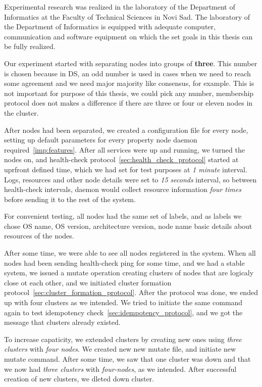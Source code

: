 Experimental research was realized in the laboratory of the Department of Informatics at the Faculty of Technical Sciences in Novi Sad. The laboratory of the Department of Informatics is equipped with adequate computer, communication and software equipment on which the set goals in this thesis can be fully realized.

Our experiment started with separating nodes into groups of \textbf{three}. This number is chosen because in DS, an odd number is used in cases when we need to reach some agreement and we need major majority like consensus, for example. This is not important for purpose of this thesis, we could pick any number, membership protocol does not makes a difference if there are three or four or eleven nodes in the cluster.

After nodes had been separated, we created a configuration file for every node, setting up default parameters for every property node daemon required~\ref{imp:features}. After all services were up and running, we turned the nodes on, and health-check protocol~\ref{sec:health_check_protocol} started at uprfront defined time, which we had set for test purposes at \emph{1 minute} interval. Logs, resources and other node details were set to \emph{15 seconds} interval, so between health-check intervals, daemon would collect resource information \emph{four times} before sending it to the rest of the system.

For convenient testing, all nodes had the same set of labels, and as labels we chose OS name, OS version, architecture version, node name basic details about resources of the nodes.

After some time, we were able to see all nodes registered in the system. When all nodes had been sending health-check ping for some time, and we had a stable system, we issued a mutate operation creating clusters of nodes that are logicaly close ot each other, and we initiated cluster formation protocol~\ref{sec:cluster_formation_protocol}. After the protocol was done, we ended up with four clusters as we intended. We tried to initiate the same command again to test idempotency check~\ref{sec:idempotency_protocol}, and we got the message that clusters already existed.

To increase capaticity, we extended clusters by creating new ones using \emph{three clusters} with \emph{four nodes}. We created new new mutate file, and initiate new mutate command. After some time, we saw that one cluster was down and that we now had \emph{three clusters} with \emph{four-nodes}, as we intended. After successful creation of new clusters, we dleted down cluster.

